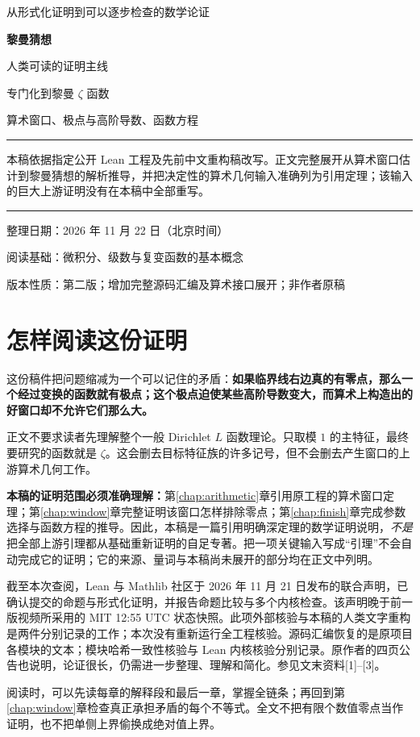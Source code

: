 \documentclass[UTF8,fontset=fandol,a4paper,openany,oneside]{ctexbook}
\theoremstyle{definition}
\theoremstyle{remark}
\begin{document}
\begin{titlepage}
\vspace*{17mm}
\begin{center}
{\Large 从形式化证明到可以逐步检查的数学论证\par}
\vspace{16mm}
{\Huge\bfseries 黎曼猜想\par}
\vspace{8mm}
{\LARGE 人类可读的证明主线\par}
\vspace{12mm}
{\large 专门化到黎曼 $\zeta$ 函数\par}
{\large 算术窗口、极点与高阶导数、函数方程\par}
\end{center}
\vspace{16mm}
\noindent\rule{\textwidth}{0.5pt}
\par\medskip
本稿依据指定公开 Lean 工程及先前中文重构稿改写。正文完整展开从算术窗口估计到黎曼猜想的解析推导，并把决定性的算术几何输入准确列为引用定理；该输入的巨大上游证明没有在本稿中全部重写。
\par\medskip
\noindent\rule{\textwidth}{0.5pt}
\vfill
\noindent 整理日期：2026 年 11 月 22 日（北京时间）\par
\noindent 阅读基础：微积分、级数与复变函数的基本概念\par
\noindent 版本性质：第二版；增加完整源码汇编及算术接口展开；非作者原稿\par
\end{titlepage}
\frontmatter
\chapter*{怎样阅读这份证明}
这份稿件把问题缩减为一个可以记住的矛盾：\textbf{如果临界线右边真的有零点，那么一个经过变换的函数就有极点；这个极点迫使某些高阶导数变大，而算术上构造出的好窗口却不允许它们那么大。}

正文不要求读者先理解整个一般 Dirichlet $L$ 函数理论。只取模 $1$ 的主特征，最终要研究的函数就是 $\zeta$。这会删去目标特征族的许多记号，但不会删去产生窗口的上游算术几何工作。

\textbf{本稿的证明范围必须准确理解：}第\ref{chap:arithmetic}章引用原工程的算术窗口定理；第\ref{chap:window}章完整证明该窗口怎样排除零点；第\ref{chap:finish}章完成参数选择与函数方程的推导。因此，本稿是一篇引用明确深定理的数学证明说明，\emph{不是}把全部上游引理都从基础重新证明的自足专著。把一项关键输入写成“引理”不会自动完成它的证明；它的来源、量词与本稿尚未展开的部分均在正文中列明。

截至本次查阅，Lean 与 Mathlib 社区于 2026 年 11 月 21 日发布的联合声明，已确认提交的命题与形式化证明，并报告命题比较与多个内核检查。该声明晚于前一版视频所采用的 MIT 12:55 UTC 状态快照。此项外部核验与本稿的人类文字重构是两件分别记录的工作；本次没有重新运行全工程核验。源码汇编恢复的是原项目各模块的文本；模块哈希一致性核验与 Lean 内核核验分别记录。原作者的四页公告也说明，论证很长，仍需进一步整理、理解和简化。参见文末资料[1]--[3]。

阅读时，可以先读每章的解释段和最后一章，掌握全链条；再回到第\ref{chap:window}章检查真正承担矛盾的每个不等式。全文不把有限个数值零点当作证明，也不把单侧上界偷换成绝对值上界。
\tableofcontents
\mainmatter
\end{document}
